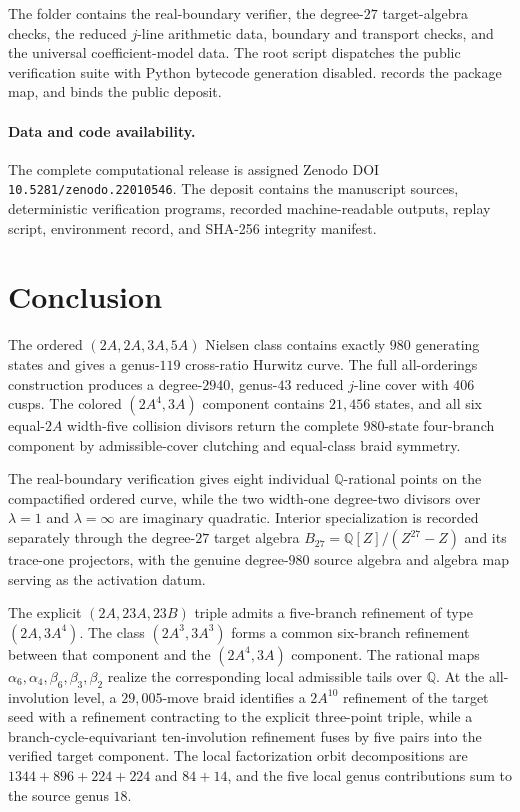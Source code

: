 \documentclass[11pt]{article}
\theoremstyle{remark}
\newcommand{\Q}{\mathbb Q}
\begin{document}
The folder  contains the real-boundary verifier, the degree-$27$ target-algebra checks, the reduced $j$-line arithmetic data, boundary and transport checks, and the universal coefficient-model data.  The root script  dispatches the public verification suite with Python bytecode generation disabled.   records the package map, and  binds the public deposit.

\paragraph{Data and code availability.} The complete computational release is assigned Zenodo DOI \texttt{10.5281/zenodo.22010546}.  The deposit contains the manuscript sources, deterministic verification programs, recorded machine-readable outputs, replay script, environment record, and SHA-256 integrity manifest.

\section{Conclusion}
\small

The ordered $(2A,2A,3A,5A)$ Nielsen class contains exactly $980$ generating states and gives a genus-$119$ cross-ratio Hurwitz curve.  The full all-orderings construction produces a degree-$2940$, genus-$43$ reduced $j$-line cover with $406$ cusps.  The colored $(2A^4,3A)$ component contains $21{,}456$ states, and all six equal-$2A$ width-five collision divisors return the complete $980$-state four-branch component by admissible-cover clutching and equal-class braid symmetry.

The real-boundary verification gives eight individual $\Q$-rational points on the compactified ordered curve, while the two width-one degree-two divisors over $\lambda=1$ and $\lambda=\infty$ are imaginary quadratic.  Interior specialization is recorded separately through the degree-$27$ target algebra $B_{27}=\Q[Z]/(Z^{27}-Z)$ and its trace-one projectors, with the genuine degree-$980$ source algebra and algebra map serving as the activation datum.

The explicit $(2A,23A,23B)$ triple admits a five-branch refinement of type $(2A,3A^4)$.  The class $(2A^3,3A^3)$ forms a common six-branch refinement between that component and the $(2A^4,3A)$ component.  The rational maps $\alpha_6,\alpha_4,\beta_6,\beta_3,\beta_2$ realize the corresponding local admissible tails over $\Q$.  At the all-involution level, a $29{,}005$-move braid identifies a $2A^{10}$ refinement of the target seed with a refinement contracting to the explicit three-point triple, while a branch-cycle-equivariant ten-involution refinement fuses by five pairs into the verified target component.  The local factorization orbit decompositions are $1344+896+224+224$ and $84+14$, and the five local genus contributions sum to the source genus $18$.
\end{document}
